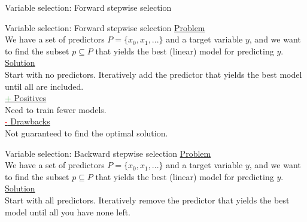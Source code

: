 \documentclass[8pt]{beamer}
\begin{document}
\begin{frame}[t,fragile]{Variable selection: Forward stepwise selection}
    \end{frame}

    \begin{frame}[t]{Variable selection: Forward stepwise selection} %
        \underline{Problem}\\
        We have a set of predictors $P=\{x_0, x_1, ...\}$ and a target variable $y$, and we want to find the subset $p \subseteq P$ that yields the best (linear) model for predicting $y$.\\
        \vspace{0.25cm}
        \underline{Solution}\\
        Start with no predictors. Iteratively add the predictor that yields the best model until all are included.\\
        \vspace{0.25cm}
        \underline{\textcolor{green}{+} Positives}\\
        Need to train fewer models.\\
        \vspace{0.25cm}
        \underline{\textcolor{red}{-} Drawbacks}\\
        Not guaranteed to find the optimal solution.\\
     \end{frame}

    \begin{frame}[t]{Variable selection: Backward stepwise selection}
        \underline{Problem}\\
        We have a set of predictors $P=\{x_0, x_1, ...\}$ and a target variable $y$, and we want to find the subset $p \subseteq P$ that yields the best (linear) model for predicting $y$.\\
        \vspace{0.25cm}
        \underline{Solution}\\
        Start with all predictors. Iteratively remove the predictor that yields the best model until all you have none left.\\
    \end{frame}
\end{document}
